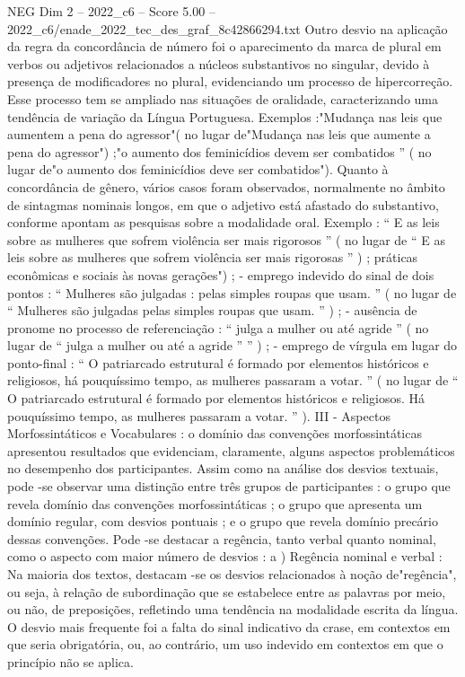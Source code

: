 \begin{textsample}{NEG Dim 2 – 2022\_c6 – Score 5.00 – 2022\_c6/enade\_2022\_tec\_des\_graf\_8c42866294.txt}
Outro desvio na aplicação da regra da concordância de número foi o aparecimento da marca de plural em verbos ou adjetivos relacionados a núcleos substantivos no singular, devido à presença de modificadores no plural, evidenciando um processo de hipercorreção.
Esse processo tem se ampliado nas situações de oralidade, caracterizando uma tendência de variação da Língua Portuguesa.
Exemplos :"Mudança nas leis que aumentem a pena do agressor"( no lugar de"Mudança nas leis que aumente a pena do agressor") ;"o aumento dos feminicídios devem ser combatidos ” ( no lugar de"o aumento dos feminicídios deve ser combatidos").
Quanto à concordância de gênero, vários casos foram observados, normalmente no âmbito de sintagmas nominais longos, em que o adjetivo está afastado do substantivo, conforme apontam as pesquisas sobre a modalidade oral.
Exemplo : “ E as leis sobre as mulheres que sofrem violência ser mais rigorosos ” ( no lugar de “ E as leis sobre as mulheres que sofrem violência ser mais rigorosas ” ) ; práticas econômicas e sociais às novas gerações") ; - emprego indevido do sinal de dois pontos : “ Mulheres são julgadas : pelas simples roupas que usam. ” ( no lugar de “ Mulheres são julgadas pelas simples roupas que usam. ” ) ; - ausência de pronome no processo de referenciação : “ julga a mulher ou até agride ” ( no lugar de “ julga a mulher ou até a agride ” ” ) ; - emprego de vírgula em lugar do ponto-final : “ O patriarcado estrutural é formado por elementos históricos e religiosos, há pouquíssimo tempo, as mulheres passaram a votar. ” ( no lugar de “ O patriarcado estrutural é formado por elementos históricos e religiosos.
Há pouquíssimo tempo, as mulheres passaram a votar. ” ).
III - Aspectos Morfossintáticos e Vocabulares : o domínio das convenções morfossintáticas apresentou resultados que evidenciam, claramente, alguns aspectos problemáticos no desempenho dos participantes.
Assim como na análise dos desvios textuais, pode -se observar uma distinção entre três grupos de participantes : o grupo que revela domínio das convenções morfossintáticas ; o grupo que apresenta um domínio regular, com desvios pontuais ; e o grupo que revela domínio precário dessas convenções.
Pode -se destacar a regência, tanto verbal quanto nominal, como o aspecto com maior número de desvios : a ) Regência nominal e verbal : Na maioria dos textos, destacam -se os desvios relacionados à noção de"regência", ou seja, à relação de subordinação que se estabelece entre as palavras por meio, ou não, de preposições, refletindo uma tendência na modalidade escrita da língua.
O desvio mais frequente foi a falta do sinal indicativo da crase, em contextos em que seria obrigatória, ou, ao contrário, um uso indevido em contextos em que o princípio não se aplica.

\end{textsample}
